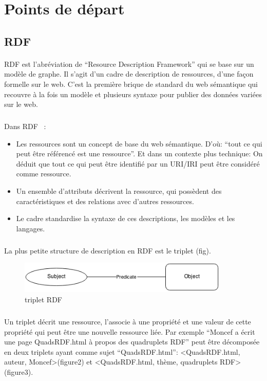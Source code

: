 \section*{Points de départ}
\subsection*{RDF}
\paragraph{}
RDF est l’abréviation de “Resource Description Framework” qui se base sur un modèle de graphe. Il s’agit d’un cadre de description de ressources, d’une façon formelle sur le web.
C’est la première brique de standard du web sémantique qui recouvre à la fois un modèle et plusieurs syntaxe pour publier des données variées sur le web.
\subparagraph{}
Dans RDF ~: 
\newline 
\begin{itemize}
\item Les ressources sont un concept de base du web sémantique. D’où:  “tout ce qui peut être référencé est une ressource”. Et dans un contexte plus technique: On déduit que tout ce qui peut être identifié par un URI/IRI peut être considéré comme ressource.
\item  Un ensemble d’attributs décrivent la ressource, qui possèdent des caractéristiques et des relations avec d’autres ressources.
\item Le cadre standardise la syntaxe de ces descriptions, les modèles et les langages.  
\end{itemize}
\subparagraph{}
La plus petite structure de description en RDF est le triplet (fig).
\begin{figure}[H]
        \centering
                \centering
                \includegraphics[width=10cm]{tripletrdf.png}
               \caption{triplet RDF}

\end{figure}
\subparagraph{}
Un triplet décrit une ressource, l’associe à une propriété et une valeur de cette propriété qui peut être une nouvelle ressource liée. Par exemple “Moncef a écrit une page QuadsRDF.html à propos des quadruplets RDF” peut être décomposée en deux triplets ayant comme sujet “QuadsRDF.html”:
<QuadsRDF.html, auteur, Moncef>(figure2) et <QuadsRDF.html, thème, quadruplets RDF>(figure3).
